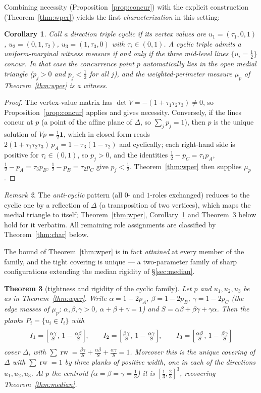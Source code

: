 \documentclass[11pt,reqno]{amsart}
\theoremstyle{plain}
\newtheorem{theorem}{Theorem}[section]
\newtheorem{corollary}[theorem]{Corollary}
\theoremstyle{definition}
\theoremstyle{remark}
\newtheorem{remark}[theorem]{Remark}
\newcommand{\rw}{\operatorname{rw}}
\begin{document}
Combining necessity (Proposition~\ref{prop:concur}) with the explicit construction
(Theorem~\ref{thm:wper}) yields the first \emph{characterization} in this setting:
\begin{corollary}\label{cor:iff}
Call a direction triple \emph{cyclic} if its vertex values are
$u_1=(\tau_1,0,1)$, $u_2=(0,1,\tau_2)$, $u_3=(1,\tau_3,0)$ with
$\tau_i\in(0,1)$. A cyclic triple admits a uniform-marginal witness measure if and
only if the three mid-level lines $\{u_i=\tfrac12\}$ concur. In that case the
concurrence point $p$ automatically lies in the open medial triangle
($p_j>0$ and $p_j<\tfrac12$ for all $j$), and the weighted-perimeter measure
$\mu_p$ of Theorem~\ref{thm:wper} is a witness.
\end{corollary}
\begin{proof}
The vertex-value matrix has $\det V=-(1+\tau_1\tau_2\tau_3)\ne0$, so
Proposition~\ref{prop:concur} applies and gives necessity. Conversely, if the lines
concur at $p$ (a point of the affine plane of $\Delta$, so $\sum_jp_j=1$), then $p$
is the unique solution of $Vp=\tfrac12\mathbf1$, which in closed form reads
$2(1+\tau_1\tau_2\tau_3)\,p_A=1-\tau_3(1-\tau_2)$ and cyclically; each right-hand
side is positive for $\tau_i\in(0,1)$, so $p_j>0$, and the identities
$\tfrac12-p_C=\tau_1p_A$, $\tfrac12-p_A=\tau_3p_B$, $\tfrac12-p_B=\tau_2p_C$ give
$p_j<\tfrac12$. Theorem~\ref{thm:wper} then supplies $\mu_p$.
\end{proof}
\begin{remark}
The \emph{anti-cyclic} pattern (all $0$- and $1$-roles exchanged) reduces to the
cyclic one by a reflection of $\Delta$ (a transposition of two vertices), which
maps the medial triangle to itself; Theorem~\ref{thm:wper},
Corollary~\ref{cor:iff} and Theorem~\ref{thm:tight} below hold for it verbatim.
All remaining role assignments are classified by Theorem~\ref{thm:char} below.
\end{remark}

The bound of Theorem~\ref{thm:wper} is in fact \emph{attained} at every member
of the family, and the tight covering is unique --- a two-parameter family of
sharp configurations extending the median rigidity of \S\ref{sec:median}.

\begin{theorem}[tightness and rigidity of the cyclic family]\label{thm:tight}
Let $p$ and $u_1,u_2,u_3$ be as in Theorem~\ref{thm:wper}. Write
$\alpha=1-2p_A$, $\beta=1-2p_B$, $\gamma=1-2p_C$ (the edge masses of $\mu_p$;
$\alpha,\beta,\gamma>0$, $\alpha+\beta+\gamma=1$) and
$S=\alpha\beta+\beta\gamma+\gamma\alpha$. Then the planks $P_i=\{u_i\in I_i\}$
with
\[
I_1=\Bigl[\tfrac{\alpha\gamma}S,\,1-\tfrac{\alpha\beta}S\Bigr],\qquad
I_2=\Bigl[\tfrac{\beta\gamma}S,\,1-\tfrac{\alpha\gamma}S\Bigr],\qquad
I_3=\Bigl[\tfrac{\alpha\beta}S,\,1-\tfrac{\beta\gamma}S\Bigr]
\]
cover $\Delta$, with $\sum\rw
=\tfrac{\beta\gamma}S+\tfrac{\alpha\beta}S+\tfrac{\alpha\gamma}S=1$. Moreover
this is the unique covering of $\Delta$ with $\sum\rw=1$ by three planks of
positive width, one in each of the directions $u_1,u_2,u_3$. At $p$ the centroid
($\alpha=\beta=\gamma=\tfrac13$) it is $[\tfrac13,\tfrac23]^3$, recovering
Theorem~\ref{thm:median}.
\end{theorem}
\end{document}
